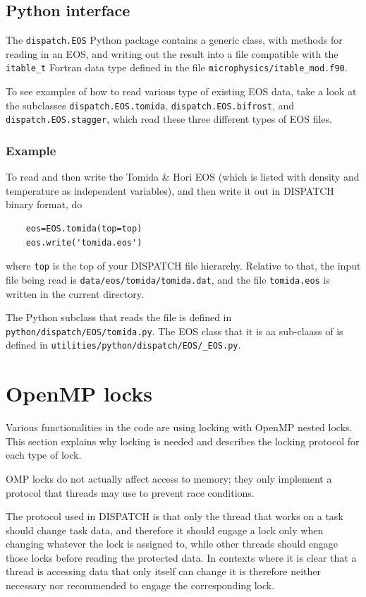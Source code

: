 \documentclass[paper=a4,fontsize=11pt]{scrartcl}
\numberwithin{equation}{section}		%
\numberwithin{figure}{section}			%
\numberwithin{table}{section}				%
\newcommand{\codecolor}{\color{Blue}}
\newcommand{\filecolor}{\color{NavyBlue}}
\newcommand{\File}[1]{{\filecolor\texttt{#1}}}
\newcommand{\Code}[1]{{\codecolor\texttt{#1}}}
\begin{document}
\subsection{Python interface}
The \Code{dispatch.EOS} Python package contains a generic class, with methods for reading in an EOS, and writing out the result into a file compatible with the \Code{itable\_t} Fortran data type defined       \textbf{\textbf{}} in the file \File{microphysics/itable\_mod.f90}.

To see examples of how to read various type of existing EOS data, take a look at the subclasses \Code{dispatch.EOS.tomida},  \Code{dispatch.EOS.bifrost}, and  \Code{dispatch.EOS.stagger}, which read these three different types of EOS files.

\subsubsection{Example}
To read and then write the Tomida \& Hori EOS (which is listed with density and temperature as independent variables), and then write it out in DISPATCH binary format, do
{\codecolor\begin{verbatim}
    eos=EOS.tomida(top=top)
    eos.write('tomida.eos')
\end{verbatim}}
where \Code{top} is the top of your DISPATCH file hierarchy.  Relative to that, the input file being read is \File{data/eos/tomida/tomida.dat}, and the file \File{tomida.eos} is written in the current directory.

The Python subclass that reads the file is defined in \File{python/dispatch/EOS/tomida.py}. The EOS class that it is aa sub-claass of is defined in \File{utilities/python/dispatch/EOS/\_EOS.py}.

\section{OpenMP locks}
Various functionalities in the code are using locking with OpenMP nested locks.  This section explains why locking is needed and describes the locking protocol for each type of lock.

OMP locks do not actually affect access to memory; they only implement a protocol that threads may use to prevent race conditions.

The protocol used in DISPATCH is that only the thread that works on a task should change task data, and therefore it should engage a lock only when changing whatever the lock is assigned to, while other threads should engage those locks before reading the protected data. In contexts where it is clear that a thread is accessing data that only itself can change it is therefore neither necessary nor recommended to engage the corresponding lock.
\end{document}
